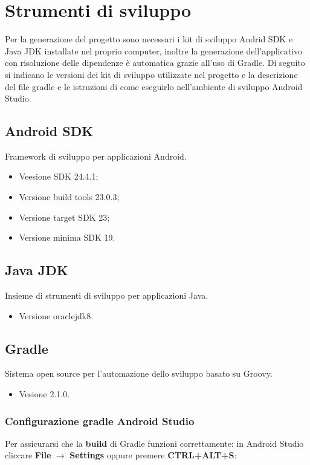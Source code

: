 \documentclass[../ManualeSviluppatore.tex]{subfiles}
\begin{document}
\section{Strumenti di sviluppo}
	
	Per la generazione del progetto sono necessari i kit di sviluppo Andrid SDK e Java JDK installate nel proprio computer, inoltre la generazione dell'applicativo con risoluzione delle dipendenze è automatica grazie all'uso di Gradle.
	Di seguito si indicano le versioni dei kit di sviluppo utilizzate nel progetto e la descrizione del file gradle e le istruzioni di come eseguirlo nell'ambiente di sviluppo Android Studio.

	\subsection{Android SDK}
		Framework di sviluppo per applicazioni Android.
		\begin{itemize} 
			\item Veesione SDK 24.4.1;
			\item Versione build tools 23.0.3;
			\item Versione target SDK 23;
			\item Versione minima SDK 19.
		\end{itemize}
		
	\subsection{Java JDK}
		Insieme di strumenti di sviluppo per applicazioni Java. 
		\begin{itemize} 
			\item Versione oraclejdk8.
		\end{itemize}
		
	\newpage
	\subsection{Gradle}
	\label{subsec:Gradle}
		Sistema open source per l'automazione dello sviluppo basato su Groovy.
		\begin{itemize} 
			\item Vesione 2.1.0.
		\end{itemize}
		
		\subsubsection{Configurazione gradle Android Studio}
			Per assicurarsi che la \textbf{build} di Gradle funzioni correttamente: in Android Studio cliccare \textbf{File} $\rightarrow$ \textbf{Settings} oppure premere \textbf{CTRL+ALT+S}:
			
\end{document}
